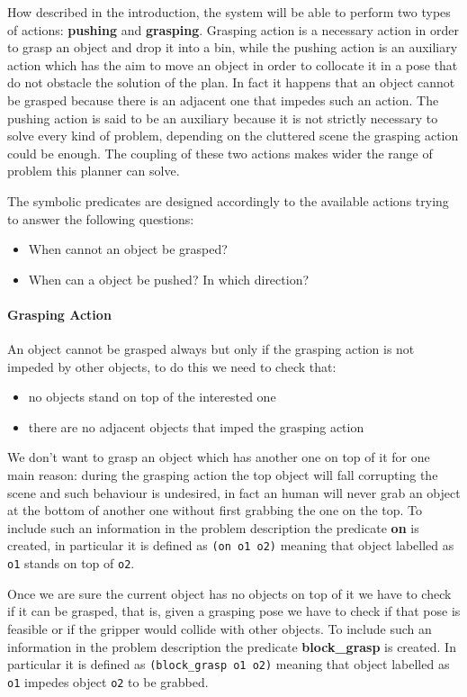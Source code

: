How described in the introduction, the system will be able to perform two types of actions: \textbf{pushing} and \textbf{grasping}.
Grasping action is a necessary action in order to grasp an object and drop it into a bin, while the pushing action is an auxiliary action which has the aim to move an object in order to collocate it in a pose that do not obstacle the solution of the plan. In fact it happens that an object cannot be grasped because there is an adjacent one that impedes such an action.
The pushing action is said to be an auxiliary because it is not strictly necessary to solve every kind of problem, depending on the cluttered scene the grasping action could be enough.
The coupling of these two actions makes wider the range of problem this planner can solve.    

The symbolic predicates are designed accordingly to the available actions trying to answer the following questions:
\begin{itemize}
\item When cannot an object be grasped? 
\item When can a object be pushed? In which direction? 
\end{itemize}

\paragraph{Grasping Action}
An object cannot be grasped always but only if the grasping action is not impeded by other objects, to do this we need to check that:
\begin{itemize}
\item no objects stand on top of the interested one
\item there are no adjacent objects that imped the grasping action
\end{itemize}
We don't want to grasp an object which has another one on top of it for one main reason: during the grasping action the top object will fall corrupting the scene and such behaviour is undesired, in fact an human will never grab an object at the bottom of another one without first grabbing the one on the top. To include such an information in the problem description the predicate \textbf{on} is created, in particular it is defined as \texttt{(on o1 o2)} meaning that object labelled as \texttt{o1} stands on top of \texttt{o2}.

Once we are sure the current object has no objects on top of it we have to check if it can be grasped, that is, given a grasping pose we have to check if that pose is feasible or if the gripper would collide with other objects. To include such an information in the problem description the predicate \textbf{block\_grasp} is created. In particular it is defined as \texttt{(block\_grasp o1 o2)} meaning that object labelled as \texttt{o1} impedes object \texttt{o2} to be grabbed.

